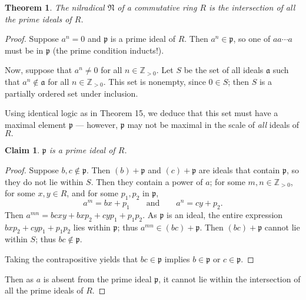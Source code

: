 \documentclass[11pt]{article}
\newtheorem{theorem}{Theorem}
\newtheorem{claim}{Claim}
\begin{document}
\begin{adjustwidth}{0.5cm}{}
	\begin{theorem}
		The nilradical $\mathfrak{N}$ of a commutative ring $R$ is the intersection of all the prime ideals of $R$.
	\end{theorem}
	\begin{proof}
		Suppose $a^{n} = 0$ and $\mathfrak{p}$ is a prime ideal of $R$. Then $a^{n} \in \mathfrak{p}$, so one of $aa \cdots a$ must be in $\mathfrak{p}$ (the prime condition inducts!).

		Now, suppose that $a^{n} \ne 0$ for all $n \in \mathbb{Z}_{> 0}$. Let $S$ be the set of all ideals $\mathfrak{a}$ such that $a^{n} \notin \mathfrak{a}$ for all $n \in \mathbb{Z}_{> 0}$. This set is nonempty, since $0 \in S$; then $S$ is a partially ordered set under inclusion. 

		Using identical logic as in Theorem 15, we deduce that this set must have a maximal element $\mathfrak{p}$ --- however, $\mathfrak{p}$ may not be maximal in the scale of \textit{all} ideals of $R.$
		\begin{adjustwidth}{0.5cm}{}
			\begin{claim}
				$\mathfrak{p}$ is a prime ideal of $R$.
			\end{claim}
			\begin{proof}\renewcommand{\qedsymbol}{}
				Suppose $b,c \notin \mathfrak{p}$. Then $(b) + \mathfrak{p}$ and $(c) + \mathfrak{p}$ are ideals that contain $\mathfrak{p}$, so they do not lie within $S$. Then they contain a power of $a$; for some $m, n \in \mathbb{Z}_{> 0}$, for some $x, y \in R$, and for some $p_{1}, p_{2}$ in $\mathfrak{p}$,
				\[
					a^{m} = bx + p_{1} \qquad \text{and} \qquad a^{n} = cy + p_{2}.
				\]
				Then $a^{mn} = bcxy + bx p_{2} + cy p_{1} + p_{1}p_{2}$. As $\mathfrak{p}$ is an ideal, the entire expression $bx p_{2} + cy p_{1} + p_{1}p_{2}$ lies within $\mathfrak{p}$; thus $a^{mn} \in (bc) + \mathfrak{p}$. Then $(bc) + \mathfrak{p}$ cannot lie within $S$; thus $bc \notin \mathfrak{p}$. 

				Taking the contrapositive yields that $bc \in \mathfrak{p}$ implies $b \in \mathfrak{p}$ or $c \in \mathfrak{p}$.
			\end{proof}
		\end{adjustwidth}
		Then as $a$ is absent from the prime ideal $\mathfrak{p}$, it cannot lie within the intersection of all the prime ideals of $R$.
	\end{proof}
\end{adjustwidth}
\end{document}
